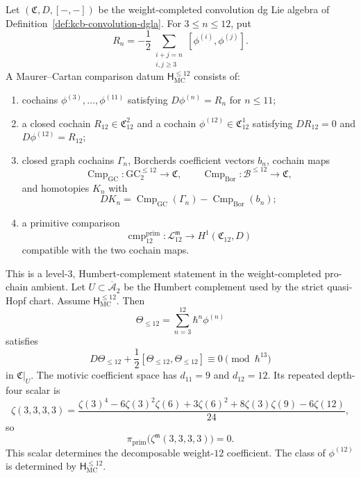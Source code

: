 \begin{definition}
\label{def:kcb-mc-comparison-weight12}
Let \((\mathfrak C,D,[-,-])\) be the weight-completed convolution dg
Lie algebra of Definition~\ref{def:kcb-convolution-dgla}.  For
\(3\leq n\leq12\), put
\[
 R_n=-\frac12\sum_{\substack{i+j=n\\i,j\geq3}}
 [\phi^{(i)},\phi^{(j)}].
\]
A Maurer--Cartan comparison datum
\(\mathsf H_{\mathrm{MC}}^{\leq12}\) consists of:
\begin{enumerate}[label=\textup{(\roman*)}]
\item cochains \(\phi^{(3)},\ldots,\phi^{(11)}\) satisfying
\(D\phi^{(n)}=R_n\) for \(n\leq11\);
\item a closed cochain \(R_{12}\in\mathfrak C^2_{12}\) and a cochain
\(\phi^{(12)}\in\mathfrak C^1_{12}\) satisfying
\(DR_{12}=0\) and \(D\phi^{(12)}=R_{12}\);
\item closed graph cochains \(\Gamma_n\), Borcherds coefficient vectors
\(b_n\), cochain maps
\[
 \operatorname{Cmp}_{\mathrm{GC}}:\mathrm{GC}_2^{\leq12}\to\mathfrak C,
 \qquad
 \operatorname{Cmp}_{\mathrm{Bor}}:\mathcal B^{\leq12}\to\mathfrak C,
\]
and homotopies \(K_n\) with
\[
 DK_n=\operatorname{Cmp}_{\mathrm{GC}}(\Gamma_n)
      -\operatorname{Cmp}_{\mathrm{Bor}}(b_n);
\]
\item a primitive comparison
\[
 \operatorname{cmp}^{\mathrm{prim}}_{12}:
 \mathcal L^{\mathfrak m}_{12}\longrightarrow H^1(\mathfrak C_{12},D)
\]
compatible with the two cochain maps.
\end{enumerate}
\end{definition}

\begin{theorem}
\label{thm:kcb-MC-hbar7-hbar12}
This is a level-$3$, Humbert-complement statement in the
weight-completed pro-chain ambient.  Let
\(U\subset\overline{\mathcal A}_2\) be the Humbert complement used
by the strict quasi-Hopf chart.  Assume
\(\mathsf H_{\mathrm{MC}}^{\leq12}\).  Then
\[
 \Theta_{\leq12}=\sum_{n=3}^{12}\hbar^n\phi^{(n)}
\]
satisfies
\[
 D\Theta_{\leq12}
 +\frac12[\Theta_{\leq12},\Theta_{\leq12}]
 \equiv0\pmod{\hbar^{13}}
\]
in \(\mathfrak C|_U\).  The motivic coefficient space has
\(d_{11}=9\) and \(d_{12}=12\).  Its repeated depth-four scalar is
\begin{equation}\label{eq:kcb-mc-zeta3333-newton}
 \zeta(3,3,3,3)
 =\frac{\zeta(3)^4-6\zeta(3)^2\zeta(6)+3\zeta(6)^2
 +8\zeta(3)\zeta(9)-6\zeta(12)}{24},
\end{equation}
so
\[
 \pi_{\mathrm{prim}}
 \bigl(\zeta^{\mathfrak m}(3,3,3,3)\bigr)=0.
\]
This scalar determines the decomposable weight-\(12\) coefficient.
The class of \(\phi^{(12)}\) is determined by
\(\mathsf H_{\mathrm{MC}}^{\leq12}\).
\end{theorem}

